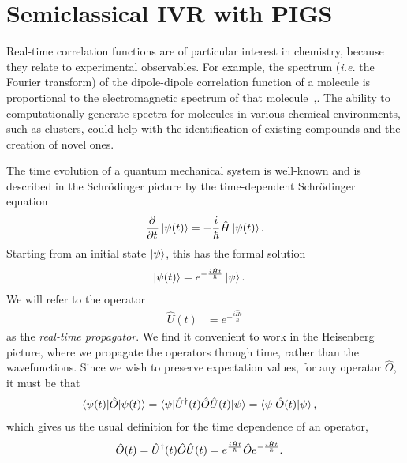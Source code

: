 \chapter{Semiclassical IVR with PIGS}

\label{chap:semiclassical}

Real-time correlation functions are of particular interest in chemistry, because they relate to experimental observables.
For example, the spectrum (\textit{i.e.} the Fourier transform) of the dipole-dipole correlation function of a molecule is proportional to the electromagnetic spectrum of that molecule~\cite[12,56]{zwanzig2001nonequilibrium},\cite[473]{mcquarrie1976statistical}.
The ability to computationally generate spectra for molecules in various chemical environments, such as clusters, could help with the identification of existing compounds and the creation of novel ones.

The time evolution of a quantum mechanical system is well-known and is described in the Schrödinger picture by the time-dependent Schrödinger equation~\cite[111]{dirac1981principles}
\begin{align}
	\dpd{}{t} \ket{\psi(t)} = -\frac{i}{\hbar} \hat{H} \ket{\psi(t)}.
\end{align}
Starting from an initial state $\ket{\psi}$, this has the formal solution
\begin{align}
	\ket{\psi(t)}
	&= e^{-\frac{i \hat{H} t}{\hbar}} \ket{\psi}.
\end{align}
We will refer to the operator
\begin{align}
	\hat{U}(t)
	&= e^{-\frac{i \hat{H} t}{\hbar}}
\end{align}
as the \emph{real-time propagator}.
We find it convenient to work in the Heisenberg picture, where we propagate the operators through time, rather than the wavefunctions.
Since we wish to preserve expectation values, for any operator $\hat{O}$, it must be that
\begin{align}
	\braket{\psi(t) | \hat{O} | \psi(t)}
	&= \braket{\psi | \hat{U}^\dagger(t) \hat{O} \hat{U}(t) | \psi}
	= \braket{\psi | \hat{O}(t) | \psi},
\end{align}
which gives us the usual definition for the time dependence of an operator,~\cite[315]{messiah1999quantum}
\begin{align}
	\hat{O}(t)
	&= \hat{U}^\dagger(t) \hat{O} \hat{U}(t)
	= e^{\frac{i \hat{H} t}{\hbar}} \hat{O} e^{-\frac{i \hat{H} t}{\hbar}}.
\end{align}

